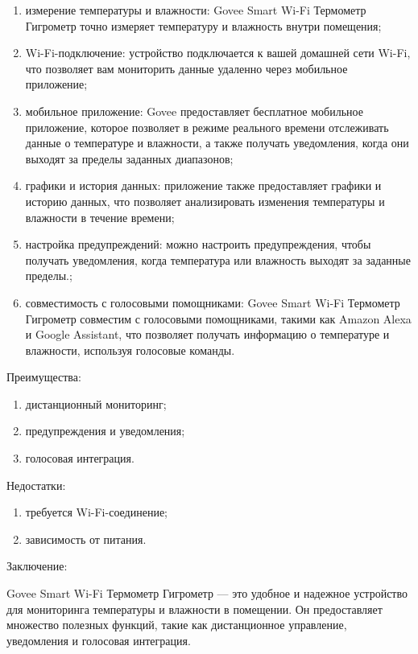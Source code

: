 \begin{enumerate}
    \item измерение температуры и влажности: Govee Smart Wi-Fi Термометр Гигрометр точно измеряет температуру и влажность внутри помещения;
    \item Wi-Fi-подключение: устройство подключается к вашей домашней сети Wi-Fi, что позволяет вам мониторить данные удаленно через мобильное приложение;
    \item мобильное приложение: Govee предоставляет бесплатное мобильное приложение, которое позволяет в режиме реального времени отслеживать данные о температуре и влажности, а также получать уведомления, когда они выходят за пределы заданных диапазонов;
    \item графики и история данных: приложение также предоставляет графики и историю данных, что позволяет анализировать изменения температуры и влажности в течение времени;
    \item настройка предупреждений: можно настроить предупреждения, чтобы получать уведомления, когда температура или влажность выходят за заданные пределы.;
    \item совместимость с голосовыми помощниками: Govee Smart Wi-Fi Термометр Гигрометр совместим с голосовыми помощниками, такими как Amazon Alexa и Google Assistant, что позволяет получать информацию о температуре и влажности, используя голосовые команды.
\end{enumerate}

Преимущества:

\begin{enumerate}
    \item дистанционный мониторинг;
    \item предупреждения и уведомления;
    \item голосовая интеграция.
\end{enumerate}

Недостатки:

\begin{enumerate}
    \item требуется Wi-Fi-соединение;
    \item зависимость от питания.
\end{enumerate}

Заключение:

Govee Smart Wi-Fi Термометр Гигрометр --- это удобное и надежное устройство для мониторинга температуры и влажности в помещении. Он предоставляет множество полезных функций, такие как дистанционное управление, уведомления и голосовая интеграция.

